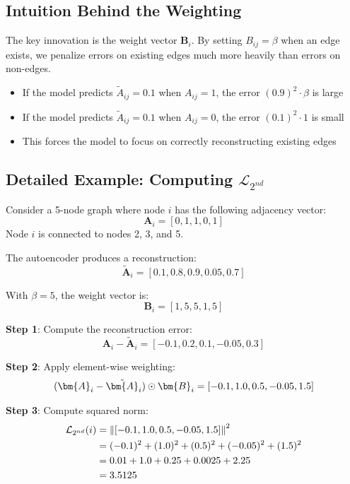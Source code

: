 \begin{notechapter}
\subsection{Intuition Behind the Weighting}

The key innovation is the weight vector $\bm{B}_i$. By setting $B_{ij} = \beta$ when an edge exists, we penalize errors on existing edges much more heavily than errors on non-edges.

\begin{tcolorbox}[colback=green!5!white,colframe=green!75!black,title=Why This Works]
\begin{itemize}
    \item If the model predicts $\tilde{A}_{ij} = 0.1$ when $A_{ij} = 1$, the error $(0.9)^2 \cdot \beta$ is large
    \item If the model predicts $\tilde{A}_{ij} = 0.1$ when $A_{ij} = 0$, the error $(0.1)^2 \cdot 1$ is small
    \item This forces the model to focus on correctly reconstructing existing edges
\end{itemize}
\end{tcolorbox}

\subsection{Detailed Example: Computing $\mathcal{L}_{2^{nd}}$}

\begin{example}
Consider a 5-node graph where node $i$ has the following adjacency vector:
\[
\bm{A}_i = [0, 1, 1, 0, 1]
\]
Node $i$ is connected to nodes 2, 3, and 5.

The autoencoder produces a reconstruction:
\[
\tilde{\bm{A}}_i = [0.1, 0.8, 0.9, 0.05, 0.7]
\]

With $\beta = 5$, the weight vector is:
\[
\bm{B}_i = [1, 5, 5, 1, 5]
\]

\textbf{Step 1}: Compute the reconstruction error:
\[
\bm{A}_i - \tilde{\bm{A}}_i = [-0.1, 0.2, 0.1, -0.05, 0.3]
\]

\textbf{Step 2}: Apply element-wise weighting:
\[
(\bm{A}_i - \tilde{\bm{A}}_i) \hadamard \bm{B}_i = [-0.1, 1.0, 0.5, -0.05, 1.5]
\]

\textbf{Step 3}: Compute squared norm:
\begin{align*}
\mathcal{L}_{2^{nd}}(i) &= \left\|[-0.1, 1.0, 0.5, -0.05, 1.5]\right\|^2 \\
&= (-0.1)^2 + (1.0)^2 + (0.5)^2 + (-0.05)^2 + (1.5)^2 \\
&= 0.01 + 1.0 + 0.25 + 0.0025 + 2.25 \\
&= 3.5125
\end{align*}


\end{example}
\end{notechapter}
